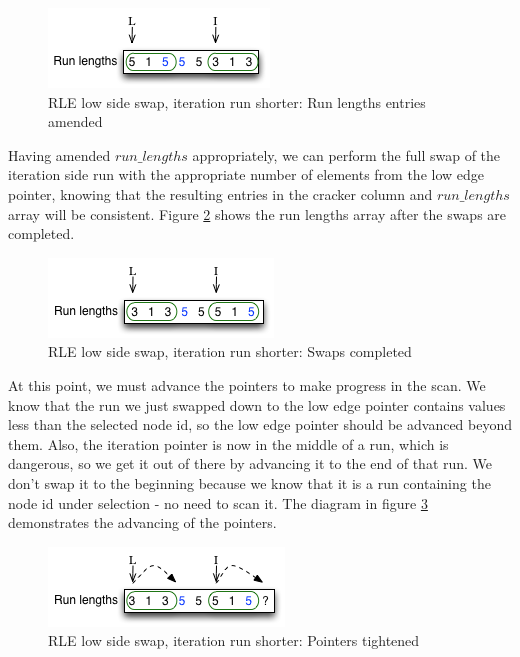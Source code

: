 \begin{figure}[H]
  \centering
  \includegraphics[]{images/d14_rle_lowside_1b}
  \caption{RLE low side swap, iteration run shorter: Run lengths entries amended}
  \label{fig:rle_lowside_1b}
\end{figure}

Having amended $run\_lengths$ appropriately, we can perform the full swap of the iteration side run with the appropriate number of elements from the low edge pointer, knowing that the resulting entries in the cracker column and $run\_lengths$ array will be consistent. Figure \ref{fig:rle_lowside_1c} shows the run lengths array after the swaps are completed.

\begin{figure}[H]
  \centering
  \includegraphics[]{images/d14_rle_lowside_1c}
  \caption{RLE low side swap, iteration run shorter: Swaps completed}
  \label{fig:rle_lowside_1c}
\end{figure}

At this point, we must advance the pointers to make progress in the scan. We know that the run we just swapped down to the low edge pointer contains values less than the selected node id, so the low edge pointer should be advanced beyond them. Also, the iteration pointer is now in the middle of a run, which is dangerous, so we get it out of there by advancing it to the end of that run. We don't swap it to the beginning because we know that it is a run containing the node id under selection - no need to scan it. The diagram in figure \ref{fig:rle_lowside_1d} demonstrates the advancing of the pointers.

\begin{figure}[H]
  \centering
  \includegraphics[]{images/d14_rle_lowside_1d}
  \caption{RLE low side swap, iteration run shorter: Pointers tightened}
  \label{fig:rle_lowside_1d}
\end{figure}

